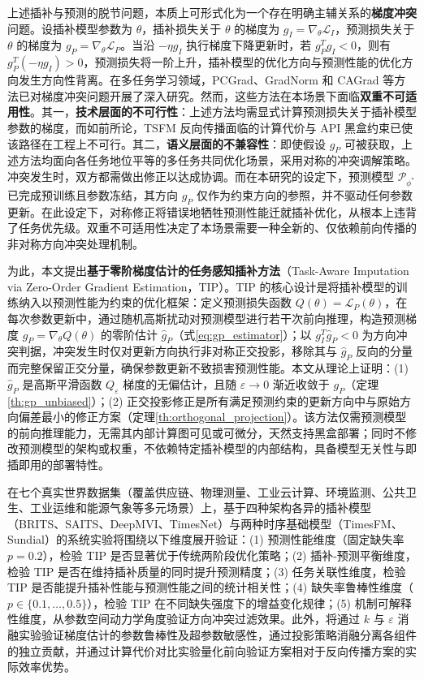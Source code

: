 \documentclass{article}
\begin{document}
上述插补与预测的脱节问题，本质上可形式化为一个存在明确主辅关系的\textbf{梯度冲突}问题。设插补模型参数为 $\theta$，插补损失关于 $\theta$ 的梯度为 $g_I = \nabla_\theta \mathcal{L}_I$，预测损失关于 $\theta$ 的梯度为 $g_P = \nabla_\theta \mathcal{L}_P$。当沿 $-\eta g_I$ 执行梯度下降更新时，若 $g_P^T g_I < 0$，则有 $g_P^T(-\eta g_I)>0$，预测损失将一阶上升，插补模型的优化方向与预测性能的优化方向发生方向性背离。在多任务学习领域，PCGrad\citep{yu2020pcgrad}、GradNorm\citep{chen2018gradnorm} 和 CAGrad\citep{liu2021cagrad} 等方法已对梯度冲突问题开展了深入研究。然而，这些方法在本场景下面临\textbf{双重不可适用性}。其一，\textbf{技术层面的不可行性}：上述方法均需显式计算预测损失关于插补模型参数的梯度，而如前所论，TSFM 反向传播面临的计算代价与 API 黑盒约束已使该路径在工程上不可行。其二，\textbf{语义层面的不兼容性}：即使假设 $g_P$ 可被获取，上述方法均面向各任务地位平等的多任务共同优化场景，采用对称的冲突调解策略。冲突发生时，双方都需做出修正以达成协调。而在本研究的设定下，预测模型 $\mathcal{P}_{\phi^\ast}$ 已完成预训练且参数冻结，其方向 $g_P$ 仅作为约束方向的参照，并不驱动任何参数更新。在此设定下，对称修正将错误地牺牲预测性能迁就插补优化，从根本上违背了任务优先级。双重不可适用性决定了本场景需要一种全新的、仅依赖前向传播的非对称方向冲突处理机制。

为此，本文提出\textbf{基于零阶梯度估计的任务感知插补方法}（Task-Aware Imputation via Zero-Order Gradient Estimation，TIP）。TIP 的核心设计是将插补模型的训练纳入以预测性能为约束的优化框架：定义预测损失函数 $Q(\theta) = \mathcal{L}_P(\theta)$，在每次参数更新中，通过随机高斯扰动对预测模型进行若干次前向推理，构造预测梯度 $g_P = \nabla_\theta Q(\theta)$ 的零阶估计 $\hat{g}_P$（式\ref{eq:gp_estimator}）；以 $g_I^T \hat{g}_P < 0$ 为方向冲突判据，冲突发生时仅对更新方向执行非对称正交投影，移除其与 $\hat{g}_P$ 反向的分量而完整保留正交分量，确保参数更新不致损害预测性能。本文从理论上证明：(1) $\hat{g}_P$ 是高斯平滑函数 $Q_\varepsilon$ 梯度的无偏估计，且随 $\varepsilon \to 0$ 渐近收敛于 $g_P$（定理\ref{th:gp_unbiased}）；(2) 正交投影修正是所有满足预测约束的更新方向中与原始方向偏差最小的修正方案（定理\ref{th:orthogonal_projection}）。该方法仅需预测模型的前向推理能力，无需其内部计算图可见或可微分，天然支持黑盒部署；同时不修改预测模型的架构或权重，不依赖特定插补模型的内部结构，具备模型无关性与即插即用的部署特性。

在七个真实世界数据集（覆盖供应链、物理测量、工业云计算、环境监测、公共卫生、工业运维和能源气象等多元场景）上，基于四种架构各异的插补模型（BRITS\citep{NEURIPS2018_734e6bfc}、SAITS\citep{du2023saits}、DeepMVI\citep{ZHANG202167}、TimesNet\citep{wu2023timesnet}）与两种时序基础模型（TimesFM\citep{pmlr-v235-das24c}、Sundial\citep{pmlr-v267-liu25be}）的系统实验将围绕以下维度展开验证：(1) 预测性能维度（固定缺失率 $p=0.2$），检验 TIP 是否显著优于传统两阶段优化策略；(2) 插补-预测平衡维度，检验 TIP 是否在维持插补质量的同时提升预测精度；(3) 任务关联性维度，检验 TIP 是否能提升插补性能与预测性能之间的统计相关性；(4) 缺失率鲁棒性维度（$p \in \{0.1,\dots,0.5\}$），检验 TIP 在不同缺失强度下的增益变化规律；(5) 机制可解释性维度，从参数空间动力学角度验证方向冲突过滤效果。此外，将通过 $k$ 与 $\varepsilon$ 消融实验验证梯度估计的参数鲁棒性及超参数敏感性，通过投影策略消融分离各组件的独立贡献，并通过计算代价对比实验量化前向验证方案相对于反向传播方案的实际效率优势。
\end{document}

